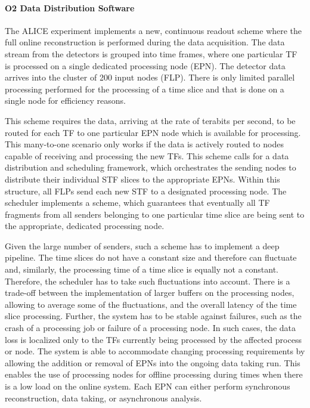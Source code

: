 \paragraph{O2 Data Distribution Software}

The ALICE experiment implements a new, continuous readout scheme where the full online reconstruction is performed during the data acquisition. 
The data stream from the detectors is grouped into time frames, where one particular TF is processed on a single dedicated processing node (EPN). 
The detector data arrives into the cluster of 200 input nodes (FLP). 
There is only limited parallel processing performed for the processing of a time slice and that is done on a single node for efficiency reasons.

This scheme requires the data, arriving at the rate of terabits per second, to be routed for each TF to one particular EPN node which is available for processing. 
This many-to-one scenario only works if the data is actively routed to nodes capable of receiving and processing the new TFs.
This scheme calls for a data distribution and scheduling framework, which orchestrates the sending nodes to distribute their individual STF slices to the appropriate EPNs. 
Within this structure, all FLPs send each new STF to a designated processing node. 
The scheduler implements a scheme, which guarantees that eventually all TF fragments from all senders belonging to one particular time slice are being sent to the appropriate, dedicated processing node.

Given the large number of senders, such a scheme has to implement a deep pipeline. 
The time slices do not have a constant size and therefore can fluctuate and, similarly, the processing time of a time slice is equally not a constant. 
Therefore, the scheduler has to take such fluctuations into account. 
There is a trade-off between the implementation of larger buffers on the processing nodes, allowing to average some of the fluctuations, and the overall latency of the time slice processing. 
Further, the system has to be stable against failures, such as the crash of a processing job or failure of a processing node. 
In such cases, the data loss is localized only to the TFs currently being processed by the affected process or node. 
The system is able to accommodate changing processing requirements by allowing the addition or removal of EPNs into the ongoing data taking run. 
This enables the use of processing nodes for offline processing during times when there is a low load on the online system. 
Each EPN can either perform synchronous reconstruction, data taking, or asynchronous analysis.

